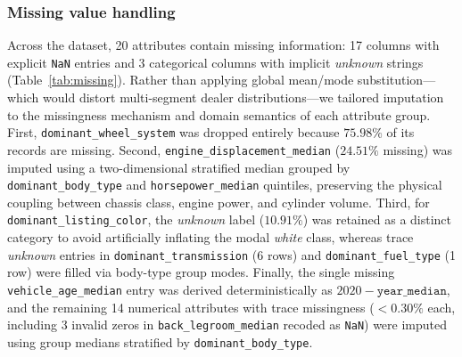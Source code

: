 \subsubsection{Missing value handling}
Across the dataset, 20 attributes contain missing information: 17 columns with explicit \texttt{NaN} entries and 3 categorical columns with implicit \emph{unknown} strings (Table~\ref{tab:missing}). Rather than applying global mean/mode substitution---which would distort multi-segment dealer distributions---we tailored imputation to the missingness mechanism and domain semantics of each attribute group. First, \texttt{dominant\_wheel\_system} was dropped entirely because $75.98\%$ of its records are missing. Second, \texttt{engine\_displacement\_median} ($24.51\%$ missing) was imputed using a two-dimensional stratified median grouped by \texttt{dominant\_body\_type} and \texttt{horsepower\_median} quintiles, preserving the physical coupling between chassis class, engine power, and cylinder volume. Third, for \texttt{dominant\_listing\_color}, the \emph{unknown} label ($10.91\%$) was retained as a distinct category to avoid artificially inflating the modal \emph{white} class, whereas trace \emph{unknown} entries in \texttt{dominant\_transmission} (6 rows) and \texttt{dominant\_fuel\_type} (1 row) were filled via body-type group modes. Finally, the single missing \texttt{vehicle\_age\_median} entry was derived deterministically as $2020 - \texttt{year\_median}$, and the remaining 14 numerical attributes with trace missingness ($<0.30\%$ each, including 3 invalid zeros in \texttt{back\_legroom\_median} recoded as \texttt{NaN}) were imputed using group medians stratified by \texttt{dominant\_body\_type}.

